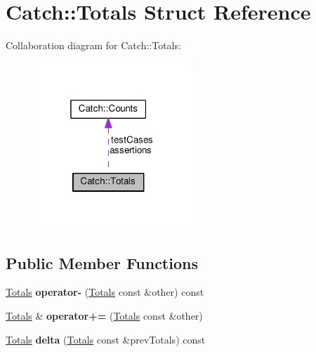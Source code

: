 \hypertarget{structCatch_1_1Totals}{}\section{Catch\+:\+:Totals Struct Reference}
\label{structCatch_1_1Totals}


Collaboration diagram for Catch\+:\+:Totals\+:\nopagebreak
\begin{figure}[H]
\begin{center}
\leavevmode
\includegraphics[width=169pt]{structCatch_1_1Totals__coll__graph}
\end{center}
\end{figure}
\subsection*{Public Member Functions}
\begin{DoxyCompactItemize}
\item 
\hyperlink{structCatch_1_1Totals}{Totals} {\bfseries operator-\/} (\hyperlink{structCatch_1_1Totals}{Totals} const \&other) const \hypertarget{structCatch_1_1Totals_abe15cd8a82ba9a4868dd7a542add827c}{}\label{structCatch_1_1Totals_abe15cd8a82ba9a4868dd7a542add827c}

\item 
\hyperlink{structCatch_1_1Totals}{Totals} \& {\bfseries operator+=} (\hyperlink{structCatch_1_1Totals}{Totals} const \&other)\hypertarget{structCatch_1_1Totals_a574015076e54cc405c70b053e3356e43}{}\label{structCatch_1_1Totals_a574015076e54cc405c70b053e3356e43}

\item 
\hyperlink{structCatch_1_1Totals}{Totals} {\bfseries delta} (\hyperlink{structCatch_1_1Totals}{Totals} const \&prev\+Totals) const \hypertarget{structCatch_1_1Totals_a3dee0f599c081a8360c0112fb1dafe8f}{}\label{structCatch_1_1Totals_a3dee0f599c081a8360c0112fb1dafe8f}

\end{DoxyCompactItemize}
